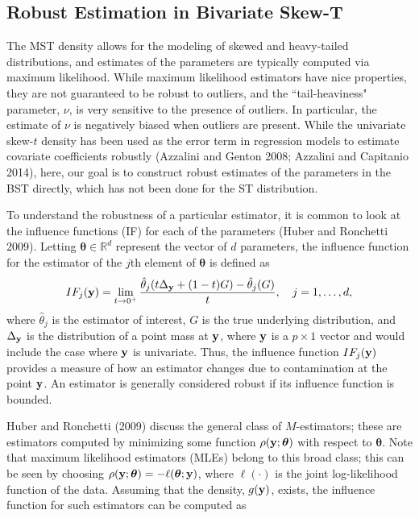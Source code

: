 \documentclass[12pt]{article}
\def\btheta{{\boldsymbol \theta}}
\def\by{{\bf y}}
\def\btheta{{\boldsymbol \theta}}
\def\by{{\bf y}}
\begin{document}
\begin{doublespacing}

\section{Robust Estimation in Bivariate Skew-T}\label{sec:robust}

The MST density  allows for the modeling of skewed and heavy-tailed distributions, and  estimates of the parameters are typically computed via maximum likelihood.  While maximum likelihood estimators have nice properties, they are not guaranteed to be robust to outliers, and  the ``tail-heaviness" parameter, $\nu$, is very sensitive to the presence of outliers.  In particular, the estimate of $\nu$ is negatively biased when outliers are present.  While the univariate skew-$t$ density has been used as the error term in regression models to estimate  covariate coefficients robustly (Azzalini and Genton 2008; Azzalini and Capitanio 2014), here, our goal is to construct robust estimates of the parameters in the BST directly, which has not been done for the ST distribution.   %


 To understand the robustness of a particular estimator, it is common to look at the influence functions (IF) for each of the parameters (Huber and Ronchetti 2009). {Letting $\btheta\in\mathbb{R}^d$ represent the vector of $d$ parameters, the influence function for the estimator of the $j$th element of $\btheta$ is defined as  
$$IF_j(\by) = \lim_{t \to 0^+} \frac{\hat{\theta}_j(t \Delta_{\by} + (1-t)G)-\hat{\theta}_j(G)}{t},\quad j=1,\ldots,d,$$}where $\hat{\theta}_j$ is the estimator of interest, $G$ is the true underlying distribution, and $\Delta_{\by}$ is the distribution of a point mass at $\by$, where $\by$ is a $p\times 1$ vector and would include the case where $\by$ is univariate.  Thus, the influence function {$IF_j(\by)$} provides a measure of how an estimator changes due to contamination at the point $\by$.  An estimator is generally considered robust if its influence function is bounded.

Huber and Ronchetti (2009) discuss the general class of $M$-estimators; these are estimators computed by  {minimizing} some function {$\rho(\by;\btheta)$} with respect to $\btheta$. Note that maximum likelihood estimators (MLEs) belong to this broad class; this can be seen by choosing $\rho(\by;\btheta) = -\ell(\btheta;\by)$, where $\ell(\cdot)$ is the joint log-likelihood function of the data.  Assuming that the density, $g(\by)$, exists, the influence function for such estimators can be computed as


\end{doublespacing}
\end{document}

